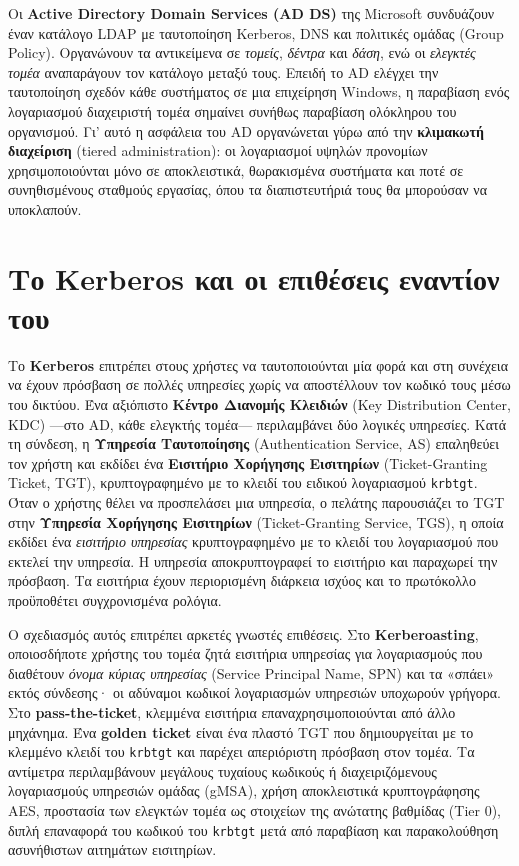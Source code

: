 Οι \textbf{Active Directory Domain Services (AD DS)} της Microsoft συνδυάζουν έναν κατάλογο LDAP με ταυτοποίηση Kerberos, DNS και πολιτικές ομάδας (Group Policy). Οργανώνουν τα αντικείμενα σε \emph{τομείς}, \emph{δέντρα} και \emph{δάση}, ενώ οι \emph{ελεγκτές τομέα} αναπαράγουν τον κατάλογο μεταξύ τους. Επειδή το AD ελέγχει την ταυτοποίηση σχεδόν κάθε συστήματος σε μια επιχείρηση Windows, η παραβίαση ενός λογαριασμού διαχειριστή τομέα σημαίνει συνήθως παραβίαση ολόκληρου του οργανισμού. Γι' αυτό η ασφάλεια του AD οργανώνεται γύρω από την \textbf{κλιμακωτή διαχείριση} (tiered administration): οι λογαριασμοί υψηλών προνομίων χρησιμοποιούνται μόνο σε αποκλειστικά, θωρακισμένα συστήματα και ποτέ σε συνηθισμένους σταθμούς εργασίας, όπου τα διαπιστευτήριά τους θα μπορούσαν να υποκλαπούν.

\section{Το Kerberos και οι επιθέσεις εναντίον του}\label{sec:8.5}
Το \textbf{Kerberos} επιτρέπει στους χρήστες να ταυτοποιούνται μία φορά και στη συνέχεια να έχουν πρόσβαση σε πολλές υπηρεσίες χωρίς να αποστέλλουν τον κωδικό τους μέσω του δικτύου. Ένα αξιόπιστο \textbf{Κέντρο Διανομής Κλειδιών} (Key Distribution Center, KDC) —στο AD, κάθε ελεγκτής τομέα— περιλαμβάνει δύο λογικές υπηρεσίες. Κατά τη σύνδεση, η \textbf{Υπηρεσία Ταυτοποίησης} (Authentication Service, AS) επαληθεύει τον χρήστη και εκδίδει ένα \textbf{Εισιτήριο Χορήγησης Εισιτηρίων} (Ticket-Granting Ticket, TGT), κρυπτογραφημένο με το κλειδί του ειδικού λογαριασμού \texttt{krbtgt}. Όταν ο χρήστης θέλει να προσπελάσει μια υπηρεσία, ο πελάτης παρουσιάζει το TGT στην \textbf{Υπηρεσία Χορήγησης Εισιτηρίων} (Ticket-Granting Service, TGS), η οποία εκδίδει ένα \emph{εισιτήριο υπηρεσίας} κρυπτογραφημένο με το κλειδί του λογαριασμού που εκτελεί την υπηρεσία. Η υπηρεσία αποκρυπτογραφεί το εισιτήριο και παραχωρεί την πρόσβαση. Τα εισιτήρια έχουν περιορισμένη διάρκεια ισχύος και το πρωτόκολλο προϋποθέτει συγχρονισμένα ρολόγια.

Ο σχεδιασμός αυτός επιτρέπει αρκετές γνωστές επιθέσεις. Στο \textbf{Kerberoasting}, οποιοσδήποτε χρήστης του τομέα ζητά εισιτήρια υπηρεσίας για λογαριασμούς που διαθέτουν \emph{όνομα κύριας υπηρεσίας} (Service Principal Name, SPN) και τα «σπάει» εκτός σύνδεσης· οι αδύναμοι κωδικοί λογαριασμών υπηρεσιών υποχωρούν γρήγορα. Στο \textbf{pass-the-ticket}, κλεμμένα εισιτήρια επαναχρησιμοποιούνται από άλλο μηχάνημα. Ένα \textbf{golden ticket} είναι ένα πλαστό TGT που δημιουργείται με το κλεμμένο κλειδί του \texttt{krbtgt} και παρέχει απεριόριστη πρόσβαση στον τομέα. Τα αντίμετρα περιλαμβάνουν μεγάλους τυχαίους κωδικούς ή διαχειριζόμενους λογαριασμούς υπηρεσιών ομάδας (gMSA), χρήση αποκλειστικά κρυπτογράφησης AES, προστασία των ελεγκτών τομέα ως στοιχείων της ανώτατης βαθμίδας (Tier 0), διπλή επαναφορά του κωδικού του \texttt{krbtgt} μετά από παραβίαση και παρακολούθηση ασυνήθιστων αιτημάτων εισιτηρίων.

